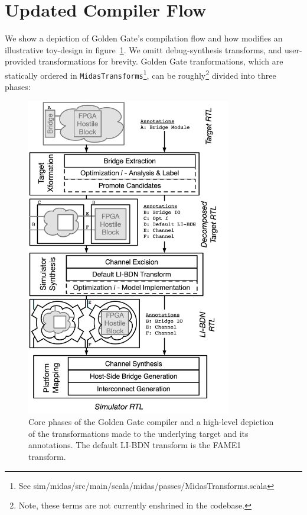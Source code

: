 \section{Updated Compiler Flow}

We show a depiction of Golden Gate's compilation flow and how modifies an
illustrative toy-design in figure~\ref{fig:gg-toolchain}.  We omitt
debug-synthesis transforms, and user-provided transformations for brevity.
Golden Gate tranformations, which are statically ordered in
\texttt{MidasTransforms}\footnote{See sim/midas/src/main/scala/midas/passes/MidasTransforms.scala}, can be
roughly\footnote{Note, these terms are not currently enshrined in the
codebase.} divided into three phases:

\begin{figure}
    \centering
    \includegraphics[width=0.8\textwidth]{figures/gg-toolchain.pdf}
    \caption{Core phases of the Golden Gate compiler and a high-level depiction
    of the transformations made to the underlying target and its annotations. The default LI-BDN transform
    is the FAME1 transform.}
    \label{fig:gg-toolchain}
\end{figure}

